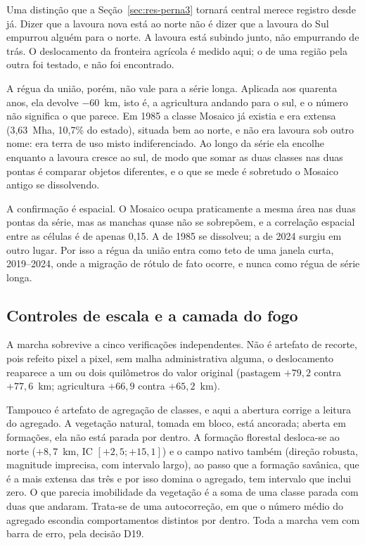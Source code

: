 Uma distinção que a Seção~\ref{sec:res-perna3} tornará central merece registro
desde já. Dizer que a lavoura nova está ao norte não é dizer que a lavoura do Sul empurrou
alguém para o norte. A lavoura está subindo junto, não empurrando de trás. O
deslocamento da fronteira agrícola é medido aqui; o de uma região pela outra
foi testado, e não foi encontrado.

A régua da união, porém, não vale para a série longa. Aplicada aos quarenta
anos, ela devolve $-60$~km, isto é, a agricultura andando para o sul, e o
número não significa o que parece. Em 1985 a classe Mosaico já existia e era
extensa (3,63~Mha, 10,7\% do estado), situada bem ao norte, e não era lavoura
sob outro nome: era terra de uso misto indiferenciado. Ao longo da série ela
encolhe enquanto a lavoura cresce ao sul, de modo que somar as duas classes nas duas
pontas é comparar objetos diferentes, e o que se mede é sobretudo o Mosaico
antigo se dissolvendo.

A confirmação é espacial. O Mosaico ocupa praticamente a mesma área nas duas
pontas da série, mas as manchas quase não se sobrepõem, e a correlação
espacial entre as células é de apenas 0,15. A de 1985 se dissolveu; a de 2024
surgiu em outro lugar. Por isso a régua da união entra como teto de uma
janela curta, 2019--2024, onde a migração de rótulo de fato ocorre, e nunca
como régua de série longa.

\subsection{Controles de escala e a camada do fogo}

A marcha sobrevive a cinco verificações independentes. Não é artefato de
recorte, pois refeito pixel a pixel, sem malha administrativa alguma, o
deslocamento reaparece a um ou dois quilômetros do valor original (pastagem
$+79{,}2$ contra $+77{,}6$~km; agricultura $+66{,}9$ contra $+65{,}2$~km).

Tampouco é artefato de agregação de classes, e aqui a abertura corrige a
leitura do agregado. A vegetação natural, tomada em bloco, está ancorada; aberta
em formações, ela não está parada por dentro. A formação florestal desloca-se
ao norte ($+8{,}7$~km, IC $[+2{,}5; +15{,}1]$) e o campo nativo também
(direção robusta, magnitude imprecisa, com intervalo largo), ao passo que a
formação savânica, que é a mais extensa das três e por isso domina o agregado,
tem intervalo que inclui zero. O que parecia imobilidade da vegetação é a soma
de uma classe parada com duas que andaram. Trata-se de uma autocorreção, em que o
número médio do agregado escondia comportamentos distintos por dentro. Toda a
marcha vem com barra de erro, pela decisão D19.

